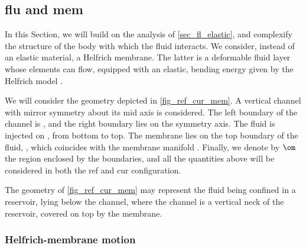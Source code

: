 
\subsection{\Acl{flu} and \acl{mem}}\label{sec_fl_mem}

In this Section, we will build on the analysis of \cref{sec_fl_elastic}, and complexify the structure of the body with which the fluid interacts. We consider, instead of an elastic material, a Helfrich membrane. The latter is a deformable fluid layer whose elements can flow, equipped with an elastic, bending energy given by the Helfrich model \cite{helfrichElasticPropertiesLipid1973,derenyiFormationInteractionMembrane2002}.

We will consider the  geometry depicted in \cref{fig_ref_cur_mem}. A vertical channel with mirror symmetry about its mid axis is considered. The left boundary of the channel is \pomin{}, and the right boundary \pomout{} lies on the symmetry axis. The fluid is injected  on \pombottom, from bottom to top. The membrane lies on the top boundary of the fluid, \pomtop{}, which  coincides with the membrane manifold \pomline{}. Finally, we denote by $\om$ the region enclosed by the boundaries, and all the quantities above will be considered in both the \ac{ref} and \ac{cur} configuration.

The geometry of \cref{fig_ref_cur_mem} may represent the fluid being confined in a  reservoir, lying below the channel, where the channel is a vertical neck of the reservoir, covered on top by the membrane.

\subsubsection{Helfrich-membrane motion}
\label{sec_fl_mem_mem}

